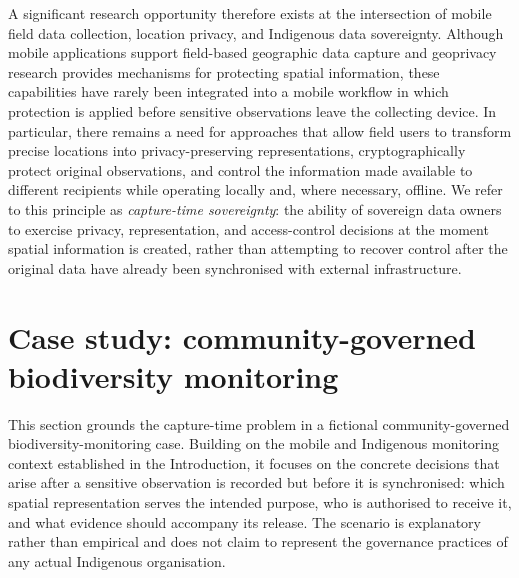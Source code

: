 \documentclass[a4paper,UKenglish,cleveref,autoref,thm-restate]{lipics-v2021}
\begin{document}
A significant research opportunity therefore exists at the intersection of mobile field data collection, location privacy, and Indigenous data sovereignty. Although mobile applications support field-based geographic data capture and geoprivacy research provides mechanisms for protecting spatial information, these capabilities have rarely been integrated into a mobile workflow in which protection is applied before sensitive observations leave the collecting device. In particular, there remains a need for approaches that allow field users to transform precise locations into privacy-preserving representations, cryptographically protect original observations, and control the information made available to different recipients while operating locally and, where necessary, offline. We refer to this principle as \emph{capture-time sovereignty}: the ability of sovereign data owners to exercise privacy, representation, and access-control decisions at the moment spatial information is created, rather than attempting to recover control after the original data have already been synchronised with external infrastructure.

\section{Case study: community-governed biodiversity monitoring}
\label{sec:case-study}

This section grounds the capture-time problem in a fictional community-governed biodiversity-monitoring case. Building on the mobile and Indigenous monitoring context established in the Introduction, it focuses on the concrete decisions that arise after a sensitive observation is recorded but before it is synchronised: which spatial representation serves the intended purpose, who is authorised to receive it, and what evidence should accompany its release. The scenario is explanatory rather than empirical and does not claim to represent the governance practices of any actual Indigenous organisation.

\end{document}
